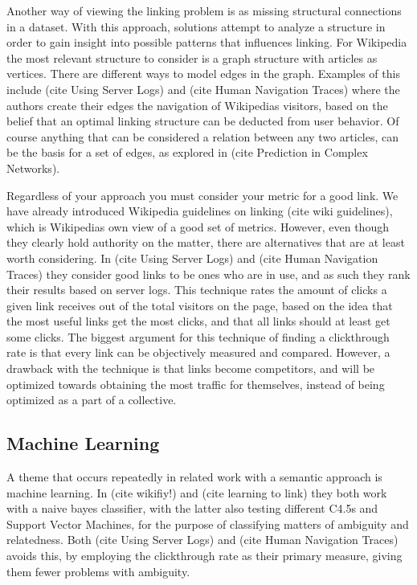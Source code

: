 Another way of viewing the linking problem is as missing structural connections in a dataset. With this approach, solutions attempt to analyze a structure in order to gain insight into possible patterns that influences linking. For Wikipedia the most relevant structure to consider is a graph structure with articles as vertices. There are different ways to model edges in the graph. Examples of this include (cite Using Server Logs) and (cite Human Navigation Traces) where the authors create their edges the navigation of Wikipedias visitors, based on the belief that an optimal linking structure can be deducted from user behavior. Of course anything that can be considered a relation between any two articles, can be the basis for a set of edges, as explored in (cite Prediction in Complex Networks).

Regardless of your approach you must consider your metric for a good link. We have already introduced Wikipedia guidelines on linking (cite wiki guidelines), which is Wikipedias own view of a good set of metrics. However, even though they clearly hold authority on the matter, there are alternatives that are at least worth considering. In (cite Using Server Logs) and (cite Human Navigation Traces) they consider good links to be ones who are in use, and as such they rank their results based on server logs. This technique rates the amount of clicks a given link receives out of the total visitors on the page, based on the idea that the most useful links get the most clicks, and that all links should at least get some clicks. The biggest argument for this technique of finding a clickthrough rate is that every link can be objectively measured and compared. However, a drawback with the technique is that links become competitors, and will be optimized towards obtaining the most traffic for themselves, instead of being optimized as a part of a collective.

\subsection{Machine Learning}\label{related_machine_learning}

A theme that occurs repeatedly in related work with a semantic approach is machine learning. In (cite wikifiy!) and (cite learning to link) they both work with a naive bayes classifier, with the latter also testing different C4.5s and Support Vector Machines, for the purpose of classifying matters of ambiguity and relatedness. Both (cite Using Server Logs) and (cite Human Navigation Traces) avoids this, by employing the clickthrough rate as their primary measure, giving them fewer problems with ambiguity.

